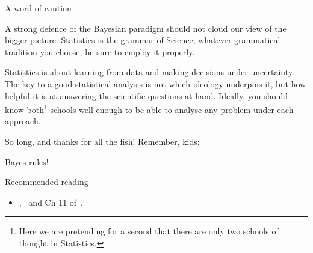 \begin{frame}{A word of caution}

A strong defence of the Bayesian paradigm should not cloud our view of the bigger picture.
Statistics is the grammar of Science; whatever grammatical tradition you choose, be sure to employ it properly.
\begin{idea}
 \label{id:not_zealot}
 Statistics is about learning from data and making decisions under uncertainty.
 The key to a good statistical analysis is not which ideology underpins it, but how helpful it is at answering the scientific questions at hand.
 Ideally, you should know both\footnote{Here we are pretending for a second that there are only two schools of thought in Statistics.} schools well enough to be able to analyse any problem under each approach.
\end{idea}
 \end{frame}
\begin{frame}{So long, and thanks for all the fish!}
 Remember, kids:
 \begin{center}
 {\Huge Bayes rules!} 
 \end{center} 
\end{frame}

\begin{frame}{Recommended reading}
\begin{itemize}
  \item[\faBook] \cite{Jaynes1976},~\cite{Efron1986} and Ch 11 of~\cite{Robert2007}.
 \end{itemize} 
\end{frame}
